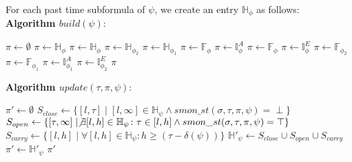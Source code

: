 \documentclass[10pt,a4paper]{article}
\begin{document}
For each past time subformula of $\psi$, we create an entry $\mathbb{H}_{\phi}$ as follows:
%
\\ \textbf{Algorithm $build(\psi)$}:
\begin{algorithmic}
\STATE $\pi \leftarrow \emptyset$
\IF{$\Phi \equiv \blacksquare_{[l,H]} \phi$}
\STATE $\pi \leftarrow \mathbb{H}_{\phi}$
\ENDIF
\IF{$\Phi \equiv \blacklozenge_{[l,h]} \phi$}
\STATE $\pi \leftarrow \mathbb{H}_{\phi}$
\ENDIF
{}
\STATE $\pi \leftarrow \mathbb{H}_{\phi_2}$
\STATE $\pi \leftarrow \mathbb{H}_{\phi_1}$
\ENDIF
\ENDFOR
{}
\IF{$\Phi \equiv \square_{[l,H]} \phi$}
\STATE $\pi \leftarrow \mathbb{F}_{\phi}$
\STATE $\pi \leftarrow \mathbb{I}_{\phi}^{A}$
\ENDIF
\IF{$\Phi \equiv \lozenge_{[l,h]} \phi$}
\STATE $\pi \leftarrow \mathbb{F}_{\phi}$
\STATE $\pi \leftarrow \mathbb{I}_{\phi}^{E}$
\ENDIF
{}
\STATE $\pi \leftarrow \mathbb{F}_{\phi_2}$
\STATE $\pi \leftarrow \mathbb{F}_{\phi_1}$
\STATE $\pi \leftarrow \mathbb{I}_{\phi_1}^{A}$
\STATE $\pi \leftarrow \mathbb{I}_{\phi_2}^{E}$
\ENDIF
\ENDFOR
\RETURN $\pi$
\end{algorithmic}


\noindent \textbf{Algorithm $update(\tau, \pi, \psi)$}:
\begin{algorithmic}
\STATE $\pi' \leftarrow \emptyset$
\STATE $S_{close} \leftarrow \{ [l, \tau] \mid  [l,\infty] \in \mathbb{H}_{\psi} \wedge smon\_st(\sigma, \tau, \pi, \psi) = \perp \}$
\STATE $S_{open} \leftarrow \{ [\tau, \infty] \mid \not\exists [l,h] \in \mathbb{H}_{\psi} \colon \tau \in [l,h] \wedge smon\_st(\sigma, \tau,\pi,\psi) = \top \}$
\STATE $S_{carry} \leftarrow \{ [l, h] \mid \forall [l,h] \in \mathbb{H}_{\psi} \colon h \geq (\tau - \delta(\psi)) \}$
\STATE $\mathbb{H}'_{\psi} \leftarrow S_{close} \cup S_{open} \cup S_{carry}$
\STATE $\pi' \leftarrow \mathbb{H}'_{\psi}$
\ENDFOR
\RETURN $\pi'$
\end{algorithmic}
\end{document}
